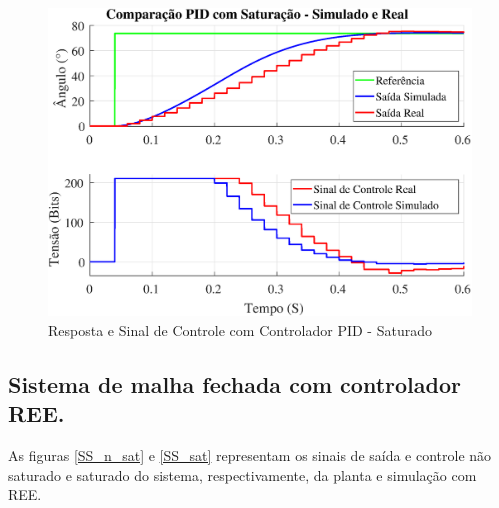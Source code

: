 \documentclass[conference,harvard,brazil,english]{sbatex}
\begin{document}
            \begin{figure}[!htb] 
                \centering
                     \includegraphics[width=\columnwidth]{imagens/malhafechada/SimuRealPIDsat.eps}{
                    \small
                    \centering
                    \caption{Resposta e Sinal de Controle com Controlador PID - Saturado}
                    \label{PID_sat}}
            \end{figure}
        
        
        
        \subsection{Sistema de malha fechada com controlador REE.}
        
        
        
            As figuras \ref{SS_n_sat} e \ref{SS_sat} representam os sinais de saída e controle não saturado e saturado do sistema, respectivamente, da planta e simulação com REE.
        
\end{document}
